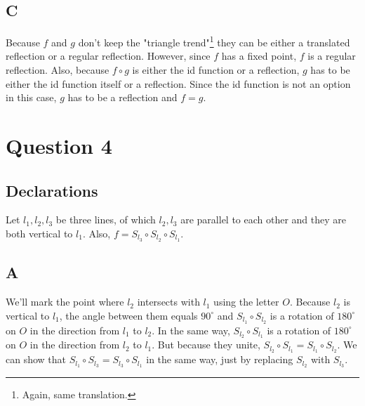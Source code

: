 \documentclass[12pt, oneside]{article}
\begin{document}
\subsection{C}
Because $f$ and $g$ don't keep the "triangle trend"\footnote{Again, same translation.} they can be either a translated reflection or a regular reflection. However, since $f$ has a fixed point, $f$ is a regular reflection. Also, because $f \circ g$ is either the id function or a reflection, $g$ has to be either the id function itself or a reflection. Since the id function is not an option in this case, $g$ has to be a reflection and $f = g$.
\clearpage

\section{Question 4}
\setcounter{subsection}{-1}
\subsection{Declarations}
Let $l_1, l_2, l_3$ be three lines, of which $l_2, l_3$ are parallel to each other and they are both vertical to $l_1$. Also, $f = S_{l_3} \circ S_{l_2} \circ S_{l_1}$.

\subsection{A}
We'll mark the point where $l_2$ intersects with $l_1$ using the letter $O$. Because $l_2$ is vertical to $l_1$, the angle between them equals $90^{\circ}$ and $S_{l_1} \circ S_{l_2}$ is a rotation of $180^{\circ}$ on $O$ in the direction from $l_1$ to $l_2$. In the same way, $S_{l_2} \circ S_{l_1}$ is a rotation of $180^{\circ}$ on $O$ in the direction from $l_2$ to $l_1$. But because they unite, $S_{l_2} \circ S_{l_1} = S_{l_1} \circ S_{l_2}$. We can show that $S_{l_1} \circ S_{l_3} = S_{l_3} \circ S_{l_1}$ in the same way, just by replacing $S_{l_2}$ with $S_{l_3}$.
\end{document}
